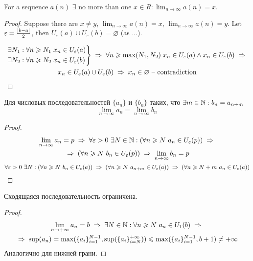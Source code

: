 \begin{theorem}
    For a sequence $a(n)$ $\exists$ no more than one $x \in R : \lim_{n \rightarrow \infty} a(n) = x$.
\end{theorem}
\begin{proof}
    Suppose there are $x \ne y$, $\lim_{n \rightarrow \infty} a(n) = x$, $\lim_{n \rightarrow \infty} a(n) = y$. Let $\varepsilon = \frac{\left\lvert b - a \right\rvert}{2}$, then $U_\varepsilon(a) \cup U_\varepsilon(b) = \varnothing$ (as ...).

    \begin{multline*}
        \begin{rcases*}
            \exists N_1 : \forall n \ge N_1 \; x_n \in U_\varepsilon(a) \\
            \exists N_2 : \forall n \ge N_2 \; x_n \in U_\varepsilon(b)
        \end{rcases*}
        \thus \forall n \ge \max(N_1, N_2) \; x_n \in U_\varepsilon(a) \land x_n \in U_\varepsilon(b)
        \thus \\ x_n \in U_\varepsilon(a) \cup U_\varepsilon(b)
        \thus x_n \in \varnothing \text{ -- contradiction}
    \end{multline*}
\end{proof}

\begin{theorem}
    Для числовых последовательностей $\{ a_n \}$ и $\{ b_n \}$ таких, что $ \exists m \in \mathbb{N} : b_n = a_{n + m}$
    \[ \lim_{n \to \infty} a_n = \lim_{n \to \infty} b_n \]
\end{theorem}
\begin{proof}
    \begin{multline*}
        \lim_{n \to \infty} a_n = p \thus
        \forall \epsilon > 0 \ \exists N \in \N: (\forall n \ge N\ a_n \in U_\epsilon(p)) \thus \\
        \thus (\forall n \ge N\ b_n \in U_\epsilon(p)) \thus
        \lim_{n \to \infty} b_n = p
    \end{multline*}
    \[ \forall \epsilon > 0 \ \exists N : (\forall n \ge N\ b_n \in U_\epsilon(a)) \thus (\forall n \ge N\ a_{n + m} \in U_\epsilon(a)) \thus (\forall n \ge N + m \ a_{n} \in U_\epsilon(a)) \]
\end{proof}


\begin{theorem}
    Сходящаяся последовательность ограничена.
    \label{limit_means_bounds}
\end{theorem}
\begin{proof}
    \begin{multline*}
        \limpinf a_n = b \thus
        \exists N \in \N: \forall n \ge N\ a_n \in U_1(b) \thus \\
        \thus \sup(a_n) = \max(\{a_i\}_{i=1}^{N - 1}, \sup(\{a_i\}_{i=N}^{+\infty})) \le
        \max(\{a_i\}_{i=1}^{N - 1}, b + 1) \ne +\infty
    \end{multline*}
    Аналогично для нижней грани.
\end{proof}

